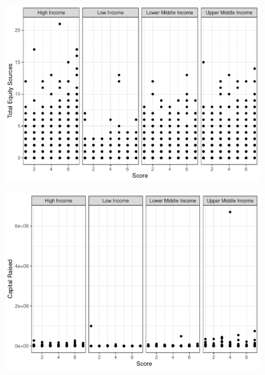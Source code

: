 \documentclass[
  english,
  man]{apa6}
\begin{document}
\begin{figure}[!H]
\includegraphics{Manuscript_files/figure-latex/unnamed-chunk-12-1} \caption{ }\label{fig:unnamed-chunk-12-1}
\end{figure}
\begin{figure}[!H]
\includegraphics{Manuscript_files/figure-latex/unnamed-chunk-12-2} \caption{ }\label{fig:unnamed-chunk-12-2}
\end{figure}
\end{document}
